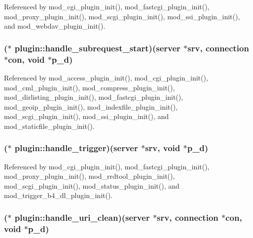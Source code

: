 Referenced by mod\-\_\-cgi\-\_\-plugin\-\_\-init(), mod\-\_\-fastcgi\-\_\-plugin\-\_\-init(), mod\-\_\-proxy\-\_\-plugin\-\_\-init(), mod\-\_\-scgi\-\_\-plugin\-\_\-init(), mod\-\_\-ssi\-\_\-plugin\-\_\-init(), and mod\-\_\-webdav\-\_\-plugin\-\_\-init().

\hypertarget{structplugin_ae99ea16bdd683b294f3017490fd1e63f}{
\subsubsection[{handle\-\_\-subrequest\-\_\-start}]{($\ast$  plugin\-::handle\-\_\-subrequest\-\_\-start)({\bf server} $\ast$srv, {\bf connection} $\ast$con, void $\ast$p\-\_\-d)}}\label{structplugin_ae99ea16bdd683b294f3017490fd1e63f}


Referenced by mod\-\_\-access\-\_\-plugin\-\_\-init(), mod\-\_\-cgi\-\_\-plugin\-\_\-init(), mod\-\_\-cml\-\_\-plugin\-\_\-init(), mod\-\_\-compress\-\_\-plugin\-\_\-init(), mod\-\_\-dirlisting\-\_\-plugin\-\_\-init(), mod\-\_\-fastcgi\-\_\-plugin\-\_\-init(), mod\-\_\-geoip\-\_\-plugin\-\_\-init(), mod\-\_\-indexfile\-\_\-plugin\-\_\-init(), mod\-\_\-scgi\-\_\-plugin\-\_\-init(), mod\-\_\-ssi\-\_\-plugin\-\_\-init(), and mod\-\_\-staticfile\-\_\-plugin\-\_\-init().

\hypertarget{structplugin_a6490af8e037a60d248395a8c68ee83f0}{
\subsubsection[{handle\-\_\-trigger}]{($\ast$  plugin\-::handle\-\_\-trigger)({\bf server} $\ast$srv, void $\ast$p\-\_\-d)}}\label{structplugin_a6490af8e037a60d248395a8c68ee83f0}


Referenced by mod\-\_\-cgi\-\_\-plugin\-\_\-init(), mod\-\_\-fastcgi\-\_\-plugin\-\_\-init(), mod\-\_\-proxy\-\_\-plugin\-\_\-init(), mod\-\_\-rrdtool\-\_\-plugin\-\_\-init(), mod\-\_\-scgi\-\_\-plugin\-\_\-init(), mod\-\_\-status\-\_\-plugin\-\_\-init(), and mod\-\_\-trigger\-\_\-b4\-\_\-dl\-\_\-plugin\-\_\-init().

\hypertarget{structplugin_afc26fff5d1ec7666608fda729b6a9a74}{
\subsubsection[{handle\-\_\-uri\-\_\-clean}]{($\ast$  plugin\-::handle\-\_\-uri\-\_\-clean)({\bf server} $\ast$srv, {\bf connection} $\ast$con, void $\ast$p\-\_\-d)}}\label{structplugin_afc26fff5d1ec7666608fda729b6a9a74}


